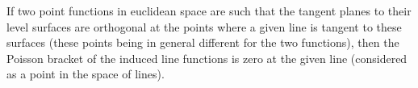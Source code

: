 If two point functions in euclidean space are such that the tangent planes to their level surfaces are orthogonal at the points where a given line is tangent to these surfaces (these points being in general different for the two functions), then the Poisson bracket of the induced line functions is zero at the given line (considered as a point in the space of lines).

